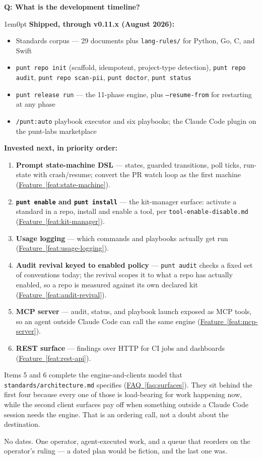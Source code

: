 \documentclass[11pt,letterpaper]{article}
\newcounter{faqnum}
\newenvironment{faqpair}[1]{%
  \needspace{4\baselineskip}%
  \vspace{0.5em}%
  \refstepcounter{faqnum}%
  \noindent\textbf{\color{SectionBlue}Q\thefaqnum: #1}\par\nopagebreak[4]%
  \vspace{0.2em}%
  \begin{adjustwidth}{1em}{0pt}%
  \setlength{\parindent}{0pt}%
}{%
  \end{adjustwidth}%
  \vspace{0.5em}%
}
\newcommand{\faqref}[1]{\hyperref[#1]{FAQ~\ref*{#1}}}
\newcommand{\featureref}[1]{\hyperref[#1]{Feature~\ref*{#1}}}
\begin{document}
\begin{faqpair}{What is the development timeline?}\label{faq:timeline}
  \textbf{Shipped, through v0.11.x (August 2026):}
  \begin{itemize}[nosep]
    \item Standards corpus --- 29 documents plus \texttt{lang-rules/} for
      Python, Go, C, and Swift
    \item \texttt{punt repo init} (scaffold, idempotent, project-type detection),
      \texttt{punt repo audit}, \texttt{punt repo scan-pii}, \texttt{punt doctor},
      \texttt{punt status}
    \item \texttt{punt release run} --- the 11-phase engine, plus
      \texttt{--resume-from} for restarting at any phase
    \item \texttt{/punt:auto} playbook executor and six playbooks; the Claude
      Code plugin on the punt-labs marketplace
  \end{itemize}

  \textbf{Invested next, in priority order:}
  \begin{enumerate}[nosep]
    \item \textbf{Prompt state-machine DSL} --- states, guarded transitions,
      poll ticks, run-state with crash/resume; convert the PR watch loop as the
      first machine (\featureref{feat:state-machine}).
    \item \textbf{\texttt{punt enable} and \texttt{punt install}} --- the
      kit-manager surface: activate a standard in a repo, install and enable a
      tool, per \texttt{tool-enable-disable.md}
      (\featureref{feat:kit-manager}).
    \item \textbf{Usage logging} --- which commands and playbooks actually get
      run (\featureref{feat:usage-logging}).
    \item \textbf{Audit revival keyed to enabled policy} --- \texttt{punt
      audit} checks a fixed set of conventions today; the revival scopes it to
      what a repo has actually enabled, so a repo is measured against its own
      declared kit (\featureref{feat:audit-revival}).
    \item \textbf{MCP server} --- audit, status, and playbook launch exposed as
      MCP tools, so an agent outside Claude Code can call the same engine
      (\featureref{feat:mcp-server}).
    \item \textbf{REST surface} --- findings over HTTP for CI jobs and
      dashboards (\featureref{feat:rest-api}).
  \end{enumerate}
  Items 5 and 6 complete the engine-and-clients model that
  \texttt{standards/architecture.md} specifies (\faqref{faq:surfaces}). They
  sit behind the first four because every one of those is load-bearing for
  work happening now, while the second client surfaces pay off when something
  outside a Claude Code session needs the engine. That is an ordering call, not
  a doubt about the destination.

  No dates. One operator, agent-executed work, and a queue that reorders on
  the operator's ruling --- a dated plan would be fiction, and the last one
  was.
\end{faqpair}
\end{document}

